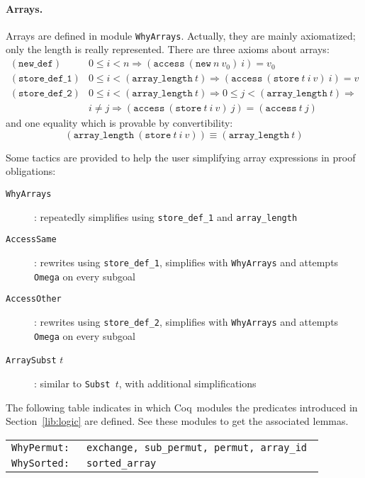 \documentclass[a4paper,12pt]{report}
\makeatletter
\newcommand{\coq}{\textsf{Coq}\index{Coq@\textsf{Coq}}}
\newcommand{\te}[1]{\texttt{#1}}
\makeatother
\begin{document}
\paragraph{Arrays.} 
Arrays are defined in module \texttt{WhyArrays}. Actually, they are
mainly axiomatized; only the length is really represented.
There are three axioms about arrays:
\begin{displaymath}
  \begin{array}{rl}
    (\te{new\_def}) &
    0 \le i < n \Rightarrow (\te{access} ~ (\te{new} ~ n ~ v_0) ~ i) = v_0 
    \\[1em]
    (\te{store\_def\_1}) &
    0 \le i < (\te{array\_length} ~ t) \Rightarrow
                    (\te{access} ~ (\te{store} ~ t ~ i ~ v) ~ i) = v
    \\[1em]
    (\te{store\_def\_2}) &
    0 \le i < (\te{array\_length} ~ t) \Rightarrow
    0 \le j < (\te{array\_length} ~ t) \Rightarrow \\ &
                    i \not= j \Rightarrow
                    (\te{access} ~ (\te{store} ~ t ~ i ~ v) ~ j) =
                    (\te{access} ~ t ~ j)
  \end{array}
\end{displaymath}
and one equality which is provable by convertibility:
\begin{displaymath}
  (\te{array\_length} ~ (\te{store} ~ t ~ i ~ v)) \equiv
  (\te{array\_length} ~ t)
\end{displaymath}

Some tactics are provided to help the user simplifying array expressions
in proof obligations:
\begin{description}
\item[\texttt{WhyArrays}] : repeatedly simplifies using
  \texttt{store\_def\_1} and \texttt{array\_length}
\item[\texttt{AccessSame}] : rewrites using \texttt{store\_def\_1},
  simplifies with \texttt{WhyArrays} and attempts \texttt{Omega} on
  every subgoal
\item[\texttt{AccessOther}] : rewrites using \texttt{store\_def\_2},
  simplifies with \texttt{WhyArrays} and attempts \texttt{Omega} on
  every subgoal
\item[\texttt{ArraySubst} $t$] : similar to \texttt{Subst $t$}, with
  additional simplifications
\end{description}

The following table indicates in which \coq\ modules the predicates
introduced in Section~\ref{lib:logic} are defined. See these modules
to get the associated lemmas.
\begin{center}
  \begin{tabular}{rl}
    \tt WhyPermut: & \tt exchange, sub\_permut, permut, array\_id \\
    \tt WhySorted: & \tt sorted\_array
  \end{tabular}
\end{center}
\end{document}
